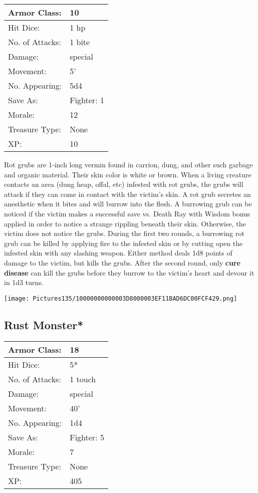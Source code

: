 \documentclass[a4paper,twoside,openany,10pt]{book}
\begin{document}
\begin{multicols}{2}
\begin{tabularx}{0.50\textwidth}{@{}lX@{}}
Armor Class: & 10 \\\hline
Hit Dice: & 1 hp \\\hline
No. of Attacks: & 1 bite \\\hline
Damage: & special \\\hline
Movement: & 5' \\\hline
No. Appearing: & 5d4 \\\hline
Save As: & Fighter: 1 \\\hline
Morale: & 12 \\\hline
Treasure Type: & None \\\hline
XP: & 10 \\\hline
\end{tabularx}\medskip

Rot grubs are 1-inch long vermin found in carrion, dung, and other such garbage and organic material. Their skin color is white or brown. When a living creature contacts an area (dung heap, offal, etc) infested with rot grubs, the grubs will attack if they can come in contact with the victim's skin. A rot grub secretes an anesthetic when it bites and will burrow into the flesh. A burrowing grub can be noticed if the victim makes a successful save vs. Death Ray with Wisdom bonus applied in order to notice a strange rippling beneath their skin. Otherwise, the victim does not notice the grubs. During the first two rounds, a burrowing rot grub can be killed by applying fire to the infested skin or by cutting open the infested skin with any slashing weapon. Either method deals 1d8 points of damage to the victim, but kills the grubs. After the second round, only \textbf{cure disease} can kill the grubs before they burrow to the victim's heart and devour it in 1d3 turns.

\begin{center} \texttt{[image: Pictures135/10000000000003D8000003EF11BAD6DC00FCF429.png]} \end{center}


\subsection*{Rust Monster*}\label{rust-monster}

\begin{tabularx}{0.50\textwidth}{@{}lX@{}}
Armor Class: & 18 \\\hline
Hit Dice: & 5* \\\hline
No. of Attacks: & 1 touch \\\hline
Damage: & special \\\hline
Movement: & 40' \\\hline
No. Appearing: & 1d4 \\\hline
Save As: & Fighter: 5 \\\hline
Morale: & 7 \\\hline
Treasure Type: & None \\\hline
XP: & 405 \\\hline
\end{tabularx}\medskip


\end{multicols}
\end{document}
